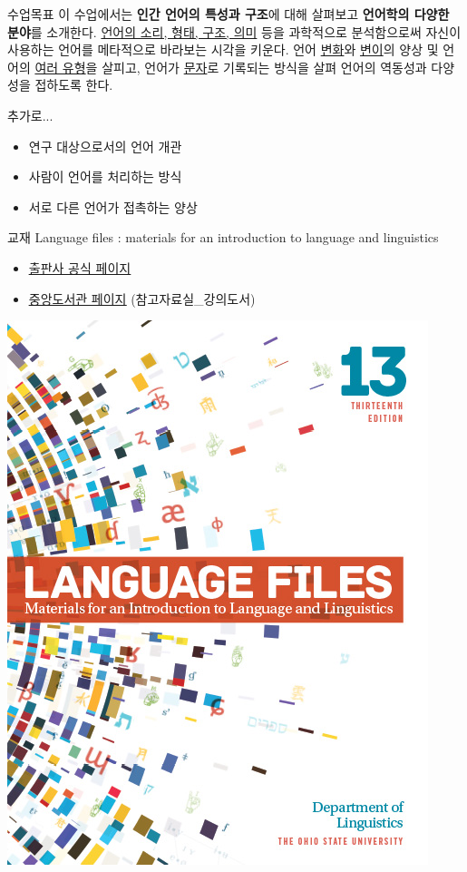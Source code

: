 \documentclass[11pt, aspectratio=169]{beamer}
\begin{document}
\begin{frame}[t]{}
  \begin{block}{수업목표}
    이 수업에서는 \textbf{인간 언어의 특성과 구조}에 대해 살펴보고 \textbf{언어학의 다양한 분야}를 소개한다. \underline{언어의 소리, 형태, 구조, 의미} 등을 과학적으로 분석함으로써 자신이 사용하는 언어를 메타적으로 바라보는 시각을 키운다. 언어 \underline{변화}와 \underline{변이}의 양상 및 언어의 \underline{여러 유형}을 살피고, 언어가 \underline{문자}로 기록되는 방식을 살펴 언어의 역동성과 다양성을 접하도록 한다.
  \end{block}
  \begin{block}{추가로...}
    \begin{itemize}
      \item 연구 대상으로서의 언어 개관
      \item 사람이 언어를 처리하는 방식
      \item 서로 다른 언어가 접촉하는 양상
    \end{itemize}
  \end{block}
\end{frame}

\begin{frame}[t]{}
  \begin{block}{교재}
    Language files : materials for an introduction to language and linguistics
    \begin{itemize}
      \item \href{https://ohiostatepress.org/books/titles/9780814258354.html}{\underline{출판사 공식 페이지}}
      \item \href{https://snu-primo.hosted.exlibrisgroup.com/permalink/f/1l6eo7m/82SNU_INST21929717540002591}{\underline{중앙도서관 페이지}} (참고자료실\_강의도서)
    \end{itemize}
  \end{block}      
  \includegraphics[height=0.6\textwidth]{img/9780814258354.jpg}
\end{frame}
\end{document}
